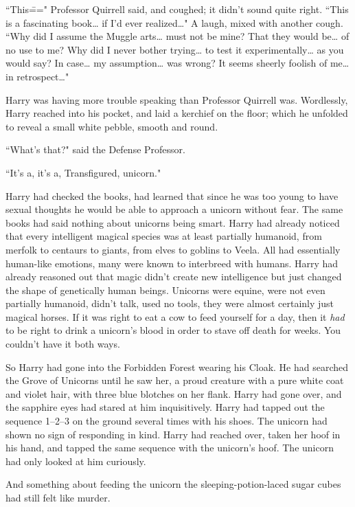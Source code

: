 ``This\===" Professor Quirrell said, and coughed; it didn't sound quite right. ``This is a fascinating book{\ldots} if I'd ever realized{\ldots}" A laugh, mixed with another cough. ``Why did I assume the Muggle arts{\ldots} must not be mine? That they would be{\ldots} of no use to me? Why did I never bother trying{\ldots} to test it experimentally{\ldots} as you would say? In case{\ldots} my assumption{\ldots} was wrong? It seems sheerly foolish of me{\ldots} in retrospect{\ldots}"

Harry was having more trouble speaking than Professor Quirrell was. Wordlessly, Harry reached into his pocket, and laid a kerchief on the floor; which he unfolded to reveal a small white pebble, smooth and round.

``What's that?" said the Defense Professor.

``It's a, it's a, Transfigured, unicorn."

Harry had checked the books, had learned that since he was too young to have sexual thoughts he would be able to approach a unicorn without fear. The same books had said nothing about unicorns being smart. Harry had already noticed that every intelligent magical species was at least partially humanoid, from merfolk to centaurs to giants, from elves to goblins to Veela. All had essentially human-like emotions, many were known to interbreed with humans. Harry had already reasoned out that magic didn't create new intelligence but just changed the shape of genetically human beings. Unicorns were equine, were not even partially humanoid, didn't talk, used no tools, they were almost certainly just magical horses. If it was right to eat a cow to feed yourself for a day, then it \emph{had} to be right to drink a unicorn's blood in order to stave off death for weeks. You couldn't have it both ways.

So Harry had gone into the Forbidden Forest wearing his Cloak. He had searched the Grove of Unicorns until he saw her, a proud creature with a pure white coat and violet hair, with three blue blotches on her flank. Harry had gone over, and the sapphire eyes had stared at him inquisitively. Harry had tapped out the sequence 1--2--3 on the ground several times with his shoes. The unicorn had shown no sign of responding in kind. Harry had reached over, taken her hoof in his hand, and tapped the same sequence with the unicorn's hoof. The unicorn had only looked at him curiously.

And something about feeding the unicorn the sleeping-potion-laced sugar cubes had still felt like murder.

